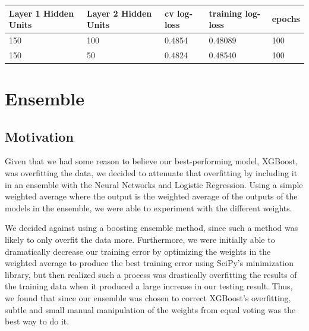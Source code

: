 \documentclass[twoside,11pt]{article}
\theoremstyle{definition}
\begin{document}
      \begin{center}
          \begin{tabular}{ | l | l | l | l | p{5cm} |}
          \hline
          Layer 1 Hidden Units & Layer 2 Hidden Units & cv log-loss & training log-loss & epochs \\ \hline
          150 & 100 & 0.4854 & 0.48089 & 100 \\ \hline
          150 & 50 & 0.4824 & 0.48540 & 100 \\ \hline
          \end{tabular}
      \end{center}

\section{Ensemble}
  \subsection{Motivation}
  Given that we had some reason to believe our best-performing model, XGBoost, was overfitting the data, we decided to attenuate that overfitting by including it in an ensemble with the Neural Networks and Logistic Regression. Using a simple weighted average where the output is the weighted average of the outputs of the models in the ensemble, we were able to experiment with the different weights.

  We decided against using a boosting ensemble method, since such a method was likely to only overfit the data more. Furthermore, we were initially able to dramatically decrease our training error by optimizing the weights in the weighted average to produce the best training error using SciPy's minimization library, but then realized such a process was drastically overfitting the results of the training data when it produced a large increase in our testing result. Thus, we found that since our ensemble was chosen to correct XGBoost's overfitting, subtle and small manual manipulation of the weights from equal voting was the best way to do it.
\end{document}
